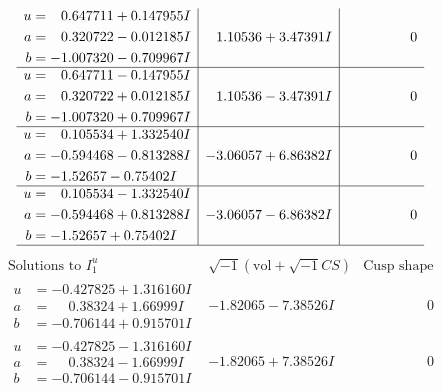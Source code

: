 \documentclass[1p]{elsarticle_modified}
\theoremstyle{definition}
\newcommand{\I}{\sqrt{-1}}
\begin{document}
$$\begin{array}{c|c|c}
\begin{aligned}
u &= \phantom{-}0.647711 + 0.147955 I \\
a &= \phantom{-}0.320722 - 0.012185 I \\
b &= -1.007320 - 0.709967 I\end{aligned}
 & \phantom{-}1.10536 + 3.47391 I & \phantom{-0.000000 } 0 \\ \hline\begin{aligned}
u &= \phantom{-}0.647711 - 0.147955 I \\
a &= \phantom{-}0.320722 + 0.012185 I \\
b &= -1.007320 + 0.709967 I\end{aligned}
 & \phantom{-}1.10536 - 3.47391 I & \phantom{-0.000000 } 0 \\ \hline\begin{aligned}
u &= \phantom{-}0.105534 + 1.332540 I \\
a &= -0.594468 - 0.813288 I \\
b &= -1.52657 - 0.75402 I\end{aligned}
 & -3.06057 + 6.86382 I & \phantom{-0.000000 } 0 \\ \hline\begin{aligned}
u &= \phantom{-}0.105534 - 1.332540 I \\
a &= -0.594468 + 0.813288 I \\
b &= -1.52657 + 0.75402 I\end{aligned}
 & -3.06057 - 6.86382 I & \phantom{-0.000000 } 0\\
 \hline 
 \end{array}$$\newpage$$\begin{array}{c|c|c}  
\text{Solutions to }I^u_{1}& \I (\text{vol} + \sqrt{-1}CS) & \text{Cusp shape}\\
 \hline 
\begin{aligned}
u &= -0.427825 + 1.316160 I \\
a &= \phantom{-}0.38324 + 1.66999 I \\
b &= -0.706144 + 0.915701 I\end{aligned}
 & -1.82065 - 7.38526 I & \phantom{-0.000000 } 0 \\ \hline\begin{aligned}
u &= -0.427825 - 1.316160 I \\
a &= \phantom{-}0.38324 - 1.66999 I \\
b &= -0.706144 - 0.915701 I\end{aligned}
 & -1.82065 + 7.38526 I & \phantom{-0.000000 } 0 \\ \hline\begin{aligned}

\end{aligned}
\end{array}$$
\end{document}
